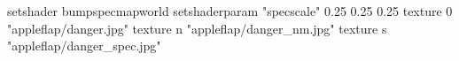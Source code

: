 setshader bumpspecmapworld	
setshaderparam "specscale" 0.25 0.25 0.25
texture 0 "appleflap/danger.jpg"
texture n "appleflap/danger_nm.jpg"
texture s "appleflap/danger_spec.jpg"
